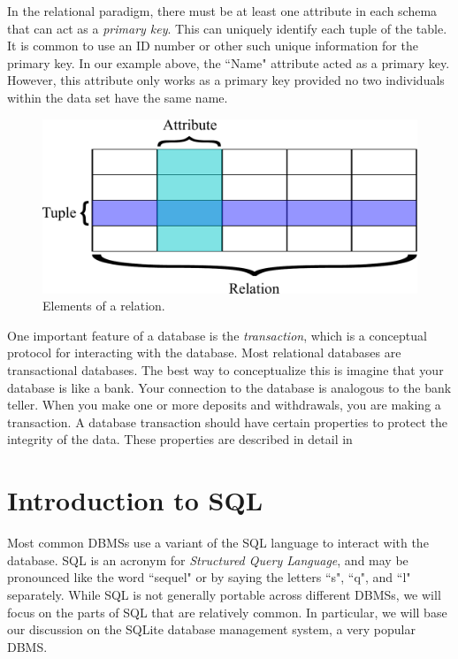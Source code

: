 In the relational paradigm, there must be at least one attribute in each schema that can act as a \emph{primary key}.
This can uniquely identify each tuple of the table.
It is common to use an ID number or other such unique information for the primary key.
In our example above, the ``Name" attribute acted as a primary key. However, this attribute only works as a primary
key provided no two individuals within the data set have the same name.
\begin{figure}
\centering
\includegraphics[width=\textwidth]{rdb_table.pdf}
\caption{Elements of a relation.}
\label{fig:relation}
\end{figure}

One important feature of a database is the \emph{transaction}, which is a conceptual protocol for
interacting with the database.
Most relational databases are transactional databases.
The best way to conceptualize this is imagine that your database is like a bank.
Your connection to the database is analogous to the bank teller.
When you make one or more deposits and withdrawals, you are making a transaction.
A database transaction should have certain properties to protect the integrity of the data.
These properties are described in detail in 

\section*{Introduction to SQL}
Most common DBMSs use a variant of the SQL language to interact with the database.
SQL is an acronym for \emph{Structured Query Language}, and may be pronounced like the word ``sequel" or by saying
the letters ``s", ``q", and ``l" separately.
While SQL is not generally portable across different DBMSs, we will focus on the parts of SQL that are relatively common.
In particular, we will base our discussion on the SQLite database management system, a very popular DBMS.

